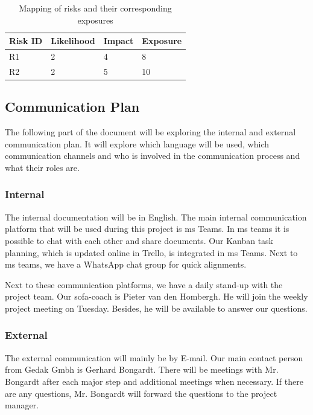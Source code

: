\begin{table}[htp]
    \caption{Mapping of risks and their corresponding exposures}
    \center
    \begin{tabular}{@{}|l|l|l|l|@{}}
        \toprule
        \textbf{Risk ID} & \textbf{Likelihood} & \textbf{Impact} & \textbf{Exposure} \\
        \midrule
        R1      & 2          & 4      & 8        \\
        \midrule
        R2      & 2          & 5      & 10 \\
        \bottomrule
    \end{tabular}\label{tab:table4}
\end{table}

\subsection{Communication Plan}\label{subsec:communication-plan}

The following part of the document will be exploring the internal and external communication plan.
It will explore which language will be used, which communication channels and who is involved in the communication
process and what their roles are.

\subsubsection{Internal}

The internal documentation will be in English.
The main internal communication platform that will be used during this project is \ac{ms} Teams.
In \ac{ms} teams it is possible to chat with each other and share documents.
Our Kanban task planning, which is updated online in Trello, is integrated in \ac{ms} Teams.
Next to \ac{ms} teams, we have a WhatsApp chat group for quick alignments.

Next to these communication platforms, we have a daily stand-up with the project team.
Our \ac{sofa}-coach is Pieter van den Hombergh.
He will join the weekly project meeting on Tuesday.
Besides, he will be available to answer our questions.

\subsubsection{External}

The external communication will mainly be by E-mail.
Our main contact person from Gedak Gmbh is Gerhard Bongardt.
There will be meetings with Mr. Bongardt after each major step and additional meetings when necessary.
If there are any questions, Mr. Bongardt will forward the questions to the project manager.

